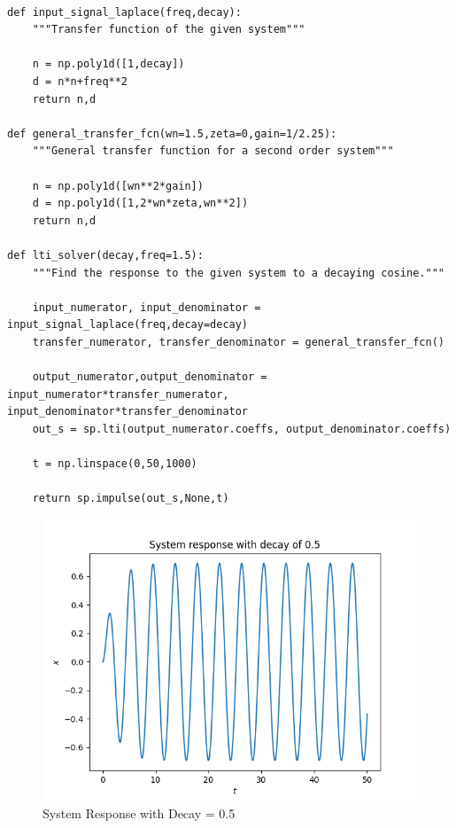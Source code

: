 \documentclass{article}
\begin{document}
\begin{lstlisting}

def input_signal_laplace(freq,decay):
    """Transfer function of the given system"""
    
    n = np.poly1d([1,decay])
    d = n*n+freq**2
    return n,d

def general_transfer_fcn(wn=1.5,zeta=0,gain=1/2.25):
    """General transfer function for a second order system"""
    
    n = np.poly1d([wn**2*gain])
    d = np.poly1d([1,2*wn*zeta,wn**2])
    return n,d

def lti_solver(decay,freq=1.5):
    """Find the response to the given system to a decaying cosine."""
    
    input_numerator, input_denominator = input_signal_laplace(freq,decay=decay)
    transfer_numerator, transfer_denominator = general_transfer_fcn()

    output_numerator,output_denominator = input_numerator*transfer_numerator, input_denominator*transfer_denominator
    out_s = sp.lti(output_numerator.coeffs, output_denominator.coeffs)

    t = np.linspace(0,50,1000)
    
    return sp.impulse(out_s,None,t)

\end{lstlisting}

\begin{figure}[tbh!]
\centering
\includegraphics[scale=0.6]{plots/System response with decay of 0.5.png}
\caption{System Response with Decay = 0.5}
\label{fig:System Response with Decay = 0.5}
\end{figure}
\end{document}
